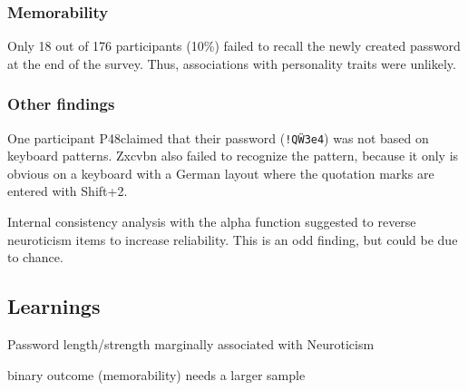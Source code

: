 \subsubsection{Memorability}
Only 18 out of 176 participants (10\%) failed to recall the newly created password at the end of the survey. Thus, associations with personality traits were unlikely.

\subsubsection{Other findings}
One participant P48claimed that their password (\texttt{!Q\"W3e4}) was not based on keyboard patterns. Zxcvbn also failed to recognize the pattern, because it only is obvious on a keyboard with a German layout where the quotation marks are entered with Shift+2. 

Internal consistency analysis with the alpha function suggested to reverse neuroticism items to increase reliability. This is an odd finding, but could be due to chance. 


\subsection{Learnings}
Password length/strength marginally associated with Neuroticism

binary outcome (memorability) needs a larger sample 
